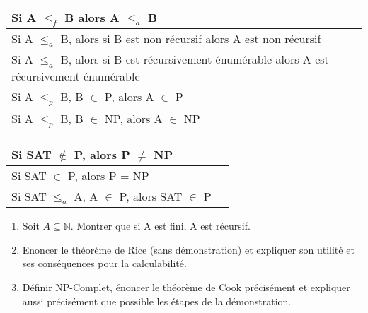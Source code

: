 \documentclass[12pt, a4paper]{article}
\begin{document}
\begin{tabular}{p{13cm}|l}
Si A $\leq_f$ B alors A $\leq_a$ B & \\ \hline
Si A $\leq_a$ B, alors si B est non récursif alors A est non récursif & \\ \hline
Si A $\leq_a$ B, alors si B est récursivement énumérable alors A est récursivement énumérable & \\ \hline
Si A $\leq_p$ B, B $\in$ P, alors A $\in$ P & \\ \hline
Si A $\leq_p$  B, B $\in$ NP, alors A $\in$ NP & \\ \hline
\end{tabular}

\begin{tabular}{p{13cm}|l}
Si SAT $\notin$ P, alors P $\not=$ NP & \\ \hline
Si SAT $\in$ P, alors P = NP & \\ \hline
Si SAT $\leq_a$ A, A $\in$ P, alors SAT $\in$ P & \\ \hline
\end{tabular}

\begin{enumerate}
	\item Soit $A \subseteq \mathbb{N}$. Montrer que si A est fini, A est récursif.
	\item Enoncer le théorème de Rice (sans démonstration) et expliquer son utilité et ses conséquences pour la calculabilité.
	\item Définir NP-Complet, énoncer le théorème de Cook précisément et expliquer aussi précisément que possible les étapes de la démonstration.
\end{enumerate}
\end{document}
